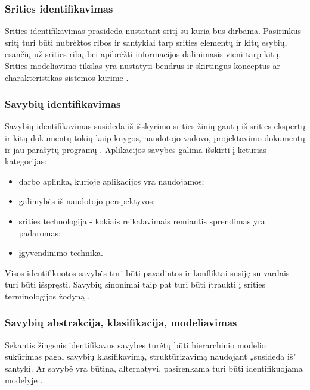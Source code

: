 \documentclass{VUMIFPSbakalaurinis}
\begin{document}
\subsubsection{Srities identifikavimas}

Srities identifikavimas prasideda nustatant sritį su kuria bus dirbama. Pasirinkus sritį turi būti nubrėžtos ribos ir santykiai tarp srities elementų ir kitų esybių, esančių už srities ribų bei apibrėžti informacijos dalinimasis vieni tarp kitų. Srities modeliavimo tikslas yra nustatyti bendrus ir skirtingus konceptus ar charakteristikas sistemos kūrime \cite{Lee2015}.

\subsubsection{Savybių identifikavimas} \label{identifikavimas}

Savybių identifikavimas susideda iš išskyrimo srities žinių gautų iš srities ekspertų ir kitų dokumentų tokių kaip knygos, naudotojo vadovo, projektavimo dokumentų ir jau parašytų programų \cite{Lee2015}. Aplikacijos savybes galima išskirti į keturias kategorijas:
\begin{itemize}[topsep=0pt,itemsep=-1ex,partopsep=1ex,parsep=1ex]
\item darbo aplinka, kurioje aplikacijos yra naudojamos;
\item galimybės iš naudotojo perspektyvos;
\item srities technologija - kokiais reikalavimais remiantis sprendimas yra padaromas;
\item įgyvendinimo technika.
\end{itemize}

Visos identifikuotos savybės turi būti pavadintos ir konfliktai susiję su vardais turi būti išspręsti. Savybių sinonimai taip pat turi būti įtraukti į srities terminologijos žodyną \cite{Kang1990}.

\subsubsection{Savybių abstrakcija, klasifikacija, modeliavimas}

Sekantis žingsnis identifikavus savybes turėtų būti hierarchinio modelio sukūrimas pagal savybių klasifikavimą, struktūrizavimą naudojant „susideda iš" santykį. Ar savybė yra būtina, alternatyvi, pasirenkama turi būti identifikuojama modelyje \cite{Kang1990}.
\end{document}

